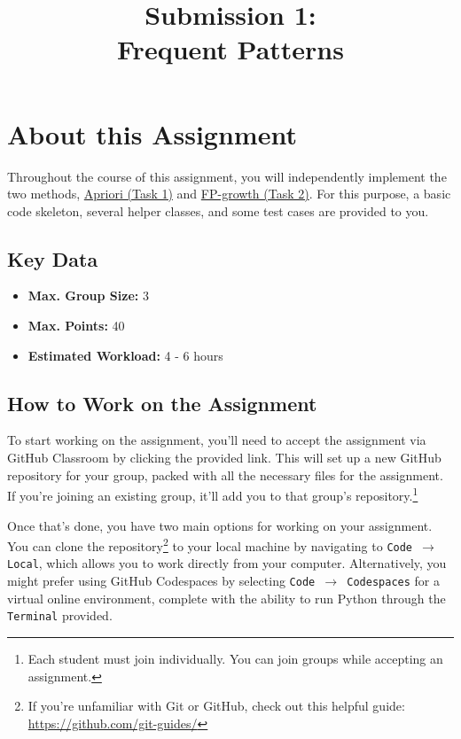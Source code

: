 \documentclass[
english,
smallborders
]{i6prcsht}
\begin{document}
\title{Submission 1: \\ Frequent Patterns}
\maketitle
\vspace*{-2cm}

\section*{About this Assignment}

Throughout the course of this assignment, you will independently implement the two methods, \hyperref[sec:task-one]{Apriori (Task 1)} and \hyperref[sec:task-one]{FP-growth (Task 2)}. For this purpose, a basic code skeleton, several helper classes, and some test cases are provided to you.

\subsection*{Key Data}

\begin{itemize}
	\item \textbf{Max. Group Size:} 3
	\item \textbf{Max. Points:} 40
	\item \textbf{Estimated Workload:} 4 - 6 hours
\end{itemize}

\subsection*{How to Work on the Assignment}

To start working on the assignment, you'll need to accept the assignment via GitHub Classroom by clicking the provided link. This will set up a new GitHub repository for your group, packed with all the necessary files for the assignment. If you're joining an existing group, it'll add you to that group's repository.\footnote{Each student must join individually. You can join groups while accepting an assignment.}

Once that's done, you have two main options for working on your assignment. You can clone the repository\footnote{If you're unfamiliar with Git or GitHub, check out this helpful guide: \url{https://github.com/git-guides/}} to your local machine by navigating to \texttt{Code $\rightarrow$ Local}, which allows you to work directly from your computer. Alternatively, you might prefer using GitHub Codespaces by selecting \texttt{Code $\rightarrow$ Codespaces} for a virtual online environment, complete with the ability to run Python through the \texttt{Terminal} provided.
\end{document}
